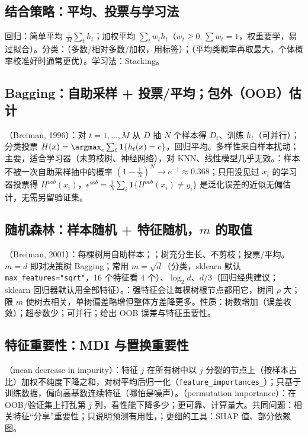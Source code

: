 \subsection{结合策略：平均、投票与学习法}
回归：简单平均 $\frac1M\sum_th_t$；加权平均 $\sum_tw_th_t$（$w_t\ge0,\sum w_t=1$，权重要学，易过拟合）。分类：（多数/相对多数/加权，用标签）；（平均类概率再取最大，个体概率校准好时通常更优）。学习法：Stacking。

\subsection{Bagging：自助采样 + 投票/平均；包外（OOB）估计}
（Breiman, 1996）：对 $t=1,\dots,M$ 从 $D$ 抽 $N$ 个样本得 $D_t$、训练 $h_t$（可并行）；分类投票 $H(x)=\argmax_c\sum_t\mathbf 1\{h_t(x)=c\}$，回归平均。多样性来自样本扰动；主要，适合学习器（未剪枝树、神经网络），对 KNN、线性模型几乎无效。：样本不被一次自助采样抽中的概率 $(1-\frac1N)^N\to e^{-1}\approx0.368$；只用没见过 $x_i$ 的学习器投票得 $H^{oob}(x_i)$，$\epsilon^{oob}=\frac1N\sum_i\mathbf 1\{H^{oob}(x_i)\ne y_i\}$ 是泛化误差的近似无偏估计，无需另留验证集。

\subsection{随机森林：样本随机 + 特征随机，\texorpdfstring{$m$}{m} 的取值}
（Breiman, 2001）：每棵树用自助样本；；树充分生长、不剪枝；投票/平均。$m=d$ 即对决策树 Bagging；常用 $m=\sqrt d$（分类，sklearn 默认 \texttt{max\_features="sqrt"}，16 个特征看 4 个）、$\log_2d$、$d/3$（回归经典建议；sklearn 回归器默认用全部特征）。：强特征会让每棵树根节点都用它，树间 $\rho$ 大；限 $m$ 使树去相关，单树偏差略增但整体方差降更多。性质：树数增加（误差收敛）；超参数少；可并行；给出 OOB 误差与特征重要性。

\subsection{特征重要性：MDI 与置换重要性}
（mean decrease in impurity）：特征 $j$ 在所有树中以 $j$ 分裂的节点上（按样本占比）加权不纯度下降之和，对树平均后归一化（\texttt{feature\_importances\_}）；只基于训练数据，偏向高基数连续特征（哪怕是噪声）。（permutation importance）：在 OOB/验证集上打乱第 $j$ 列，看性能下降多少；更可靠、计算量大。共同问题：相关特征“分享”重要性；只说明预测有用性，；更细的工具：SHAP 值、部分依赖图。

